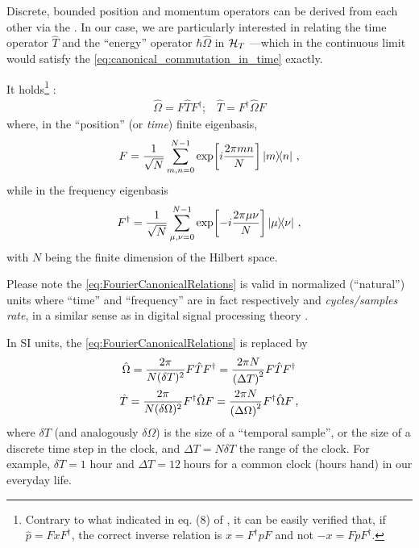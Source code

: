 Discrete, bounded position and momentum operators can be derived from
each other via
the .
In our case, we are particularly interested in relating the
time operator $\hat{T}$ and the ``energy'' operator $\hbar\hat{\Omega}$
in $\mathcal{H}_T$ ---which in the continuous limit would satisfy the
\eqref{eq:canonical_commutation_in_time} exactly.

It holds\footnote{
  Contrary to what indicated in eq. (8) of \cite{FiniteHilb},
  it can be easily verified that,
  if $ \hat{p} = F x F^{\dagger} $,
  the correct inverse relation is
  $ x = F^{\dagger} p F$ and not $ -x = F p F^{\dagger} $.
} \parencite{FiniteHilb}:
\begin{gather}\label{eq:FourierCanonicalRelations}
  \hat{\Omega} = F \hat{T} F^{\dagger}\text{;} \quad
  \hat{T} = F^{\dagger} \hat{\Omega} F
\end{gather}
where, in the ``position'' (or \emph{time}) finite eigenbasis,
\begin{equation}
  F = \frac{1}{\sqrt{N}} \sum_{m,n=0}^{N-1} \exp[i\frac{2\pi mn}{N}] \ketbra{m}{n} \, \text{,}
\end{equation}
while in the frequency eigenbasis
\begin{equation}
  F^{\dagger} = \frac{1}{\sqrt{N}} \sum_{\mu,\nu=0}^{N-1} \exp[-i\frac{2\pi \mu\nu}{N}] \ketbra{\mu}{\nu} \, \text{,}
\end{equation}
with $N$ being the finite dimension of the Hilbert space.

Please note the \eqref{eq:FourierCanonicalRelations} is valid in normalized (``natural'') units
where ``time'' and ``frequency'' are in fact respectively
 and \emph{cycles/samples rate},
in a similar sense as in digital signal processing theory
\parencite[pp. 469, 490]{Signal}.

In SI units, the \eqref{eq:FourierCanonicalRelations} is replaced by
\begin{gather}
  \label{eq:SI_Fourier:Omega}
    \hat{\Omega} = \frac{2\pi}{N(\delta T)^2} F \hat{T} F^{\dagger} = \frac{2\pi N}{\qty(\Delta T)^2} F \hat{T} F^{\dagger} \\
  \label{eq:SI_Fourier:T}
    \hat{T} = \frac{2\pi}{N(\delta\Omega)^2} F^{\dagger} \hat{\Omega} F = \frac{2\pi N}{\qty(\Delta\Omega)^2} F^{\dagger} \hat{\Omega} F
  \, \text{,}
\end{gather}
where $\delta T$ (and analogously $\delta\Omega$)
is the size of a ``temporal sample'', or the size of a discrete
time step in the clock, and $\Delta T = N\delta T$ the range of the clock.
For example,
$\delta T = \text{1 hour}$ and $\Delta T=12\;\text{hours}$
for a common clock (hours hand) in our everyday life.

